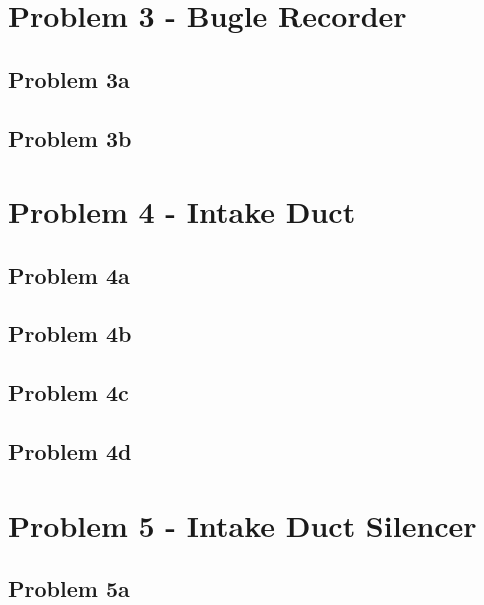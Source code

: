 \newpage
\section*{Problem 3 - Bugle Recorder}

\subsection*{Problem 3a}

\subsection*{Problem 3b}










\newpage
\section*{Problem 4 - Intake Duct}

\subsection*{Problem 4a}

\subsection*{Problem 4b}

\subsection*{Problem 4c}

\subsection*{Problem 4d}










\newpage
\section*{Problem 5 - Intake Duct Silencer}

\subsection*{Problem 5a}

